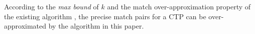 According to the \textit{max bound} of $k$ and the match over-approximation property of the existing algorithm \cite{DBLP:conf/kbse/HuangMM13}, the precise match pairs for a CTP can be over-approximated by the algorithm in this paper.




